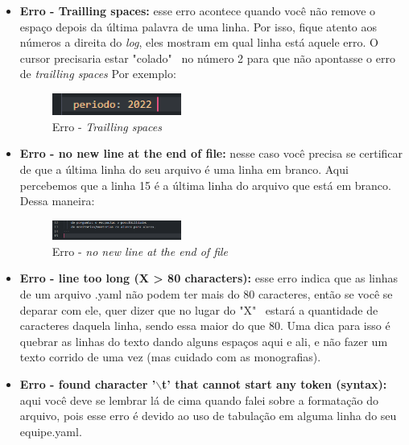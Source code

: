 \begin{itemize}
    \item \textbf{Erro - Trailling spaces:} esse erro acontece quando você não remove o espaço depois da última palavra de uma linha. Por isso, fique atento aos números a direita do \textit{log}, eles mostram em qual linha está aquele erro. O cursor precisaria estar "colado" \, no número 2 para que não apontasse o erro de \textit{trailling spaces} Por exemplo:
        \begin{figure}[htb]
        \centering
        \caption{Erro - \textit{Trailling spaces}}
        \includegraphics[width=0.4\textwidth]{anexos/Imagens_Blog/erro1.png}
        \end{figure}
        \FloatBarrier
    
    \item \textbf{Erro - no new line at the end of file: } nesse caso você precisa se certificar de que a última linha do seu arquivo é uma linha em branco. Aqui percebemos que a linha 15 é a última linha do arquivo que está em branco. Dessa maneira:
    \begin{figure}[htb]
        \centering
        \caption{Erro - \textit{no new line at the end of file}}
        \includegraphics[width=0.4\textwidth]{anexos/Imagens_Blog/erro2.png}
        \end{figure}
        \FloatBarrier
    
    \item \textbf{Erro - line too long (X > 80 characters):}  esse erro indica que as linhas de um arquivo .yaml não podem ter mais do 80 caracteres, então se você se deparar com ele, quer dizer que no lugar do "X" \, estará a quantidade de caracteres daquela linha, sendo essa maior do que 80. Uma dica para isso é quebrar as linhas do texto dando alguns espaços aqui e ali, e não fazer um texto corrido de uma vez (mas cuidado com as monografias).
    
    \item \textbf{Erro - found character '$\backslash$t' that cannot start any token (syntax):} aqui você deve se lembrar lá de cima quando falei sobre a formatação do arquivo, pois esse erro é devido ao uso de tabulação em alguma linha do seu equipe.yaml. 
\end{itemize}

